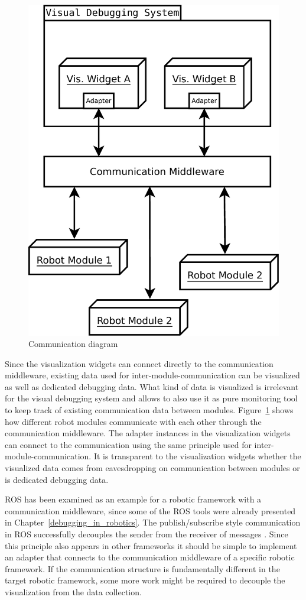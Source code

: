 
\begin{figure}%
  \centering
  \includegraphics[width=.5\textwidth]{diagrams/communication_diagram}
  \caption{Communication diagram}
  \label{communication_diagram}
\end{figure}

Since the visualization widgets can connect directly to the communication middleware, existing data used for inter-module-communication can be visualized as well as dedicated debugging data. What kind of data is visualized is irrelevant for the visual debugging system and allows to also use it as pure monitoring tool to keep track of existing communication data between modules. Figure~\ref{communication_diagram} shows how different robot modules communicate with each other through the communication middleware. The adapter instances in the visualization widgets can connect to the communication using the same principle used for inter-module-communication. It is transparent to the visualization widgets whether the visualized data comes from eavesdropping on communication between modules or is dedicated debugging data. 

ROS has been examined as an example for a robotic framework with a communication middleware, since some of the ROS tools were already presented in Chapter~\ref{debugging_in_robotics}. The publish/subscribe style communication in ROS successfully decouples the sender from the receiver of messages \cite{Eugster2003}. Since this principle also appears in other frameworks it should be simple to implement an adapter that connects to the communication middleware of a specific robotic framework. If the communication structure is fundamentally different in the target robotic framework, some more work might be required to decouple the visualization from the data collection.

